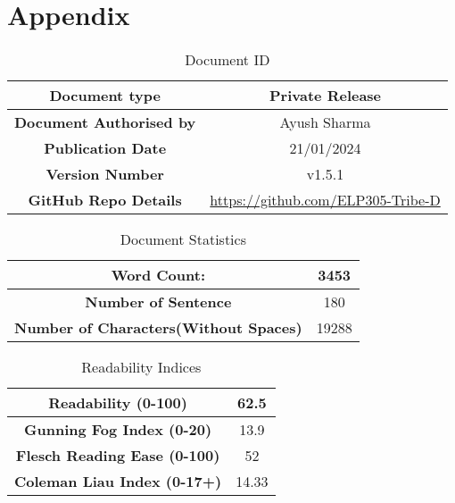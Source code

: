 \documentclass[table]{rapportCS}
\begin{document}



\section*{Appendix}\label{sec:appendix}
\begin{table}[h]
      \centering
      \begin{tabular}{|c|c|}
        \hline
        \textbf{Document type} & Private Release \\
        \hline
        \textbf{Document Authorised by} & Ayush Sharma \\
        \hline
        \textbf{Publication Date} & 21/01/2024 \\
        \hline
        \textbf{Version Number} & v1.5.1 \\
        \hline
        \textbf{GitHub Repo Details} & \href{https://github.com/naunidhsingh03/ELP305-Tribe-D}{ https://github.com/ELP305-Tribe-D} \\
        \hline
      \end{tabular}
      \caption{Document ID}
      \label{tab:documentid}
    \end{table}
\begin{table}
      \centering
      \begin{tabular}{|c|c|}
        \hline
        \textbf{Word Count}: & 3453 \\
        \hline
        \textbf{Number of Sentence} & 180 \\
        \hline
        \textbf{Number of Characters(Without Spaces)} & 19288 \\
        \hline
      \end{tabular}
      \caption{Document Statistics}
      \label{tab:documentstats}
    \end{table}

    \begin{table}
      \centering
      \begin{tabular}{|c|c|}
        \hline
        \textbf{Readability (0-100)} & 62.5 \\
        \hline
        \textbf{Gunning Fog Index (0-20)} & 13.9 \\
        \hline
        \textbf{Flesch Reading Ease (0-100)} & 52 \\
        \hline
        \textbf{Coleman Liau Index (0-17+)} & 14.33 \\
        \hline
      \end{tabular}
      \caption{Readability Indices}
      \label{tab:readability}
    \end{table}
\newpage
\end{document}
